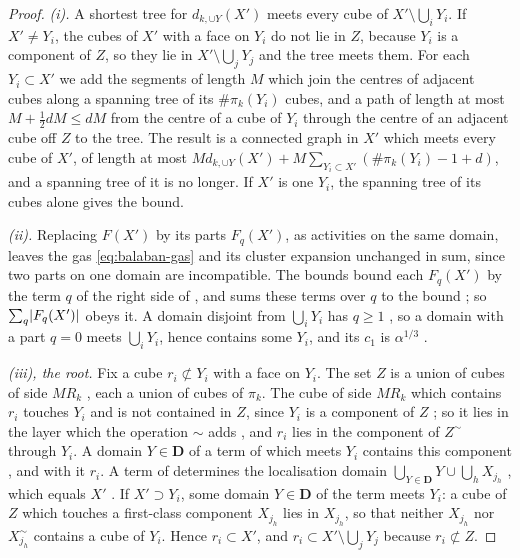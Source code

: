 \documentclass[11pt]{preprint}
\DeclarePairedDelimiter{\abs}{\lvert}{\rvert}
\numberwithin{equation}{section}
\theoremstyle{definition}
\theoremstyle{remark}
\theoremstyle{plain}
\begin{document}
\begin{proof}
\emph{(i).} A shortest tree for $d_{k,\cup Y}(X')$ meets every cube of $X' \setminus \bigcup_iY_i$. If $X' \neq Y_i$, the cubes of $X'$ with a face on $Y_i$ do not lie in $Z$, because $Y_i$ is a component of $Z$, so they lie in $X' \setminus \bigcup_jY_j$ and the tree meets them. For each $Y_i \subset X'$ we add the segments of length $M$ which join the centres of adjacent cubes along a spanning tree of its $\#\pi_k(Y_i)$ cubes, and a path of length at most $M + \frac12dM \leq dM$ from the centre of a cube of $Y_i$ through the centre of an adjacent cube off $Z$ to the tree. The result is a connected graph in $X'$ which meets every cube of $X'$, of length at most $Md_{k,\cup Y}(X') + M\sum_{Y_i \subset X'}(\#\pi_k(Y_i) - 1 + d)$, and a spanning tree of it is no longer. If $X'$ is one $Y_i$, the spanning tree of its cubes alone gives the bound.

\emph{(ii).} Replacing $F(X')$ by its parts $F_q(X')$, as activities on the same domain, leaves the gas \eqref{eq:balaban-gas} and its cluster expansion unchanged in sum, since two parts on one domain are incompatible. The bounds \cite[(1.92)--(1.95), pp.~388--389]{BalabanLFR2} bound each $F_q(X')$ by the term $q$ of the right side of \cite[(1.95)]{BalabanLFR2}, and \cite[(1.96)]{BalabanLFR2} sums these terms over $q$ to the bound \cite[(1.97)]{BalabanLFR2}; so $\sum_q\abs{F_q(X')}$ obeys it. A domain disjoint from $\bigcup_iY_i$ has $q \geq 1$ \cite[p.~389, ll.~27--28]{BalabanLFR2}, so a domain with a part $q = 0$ meets $\bigcup_iY_i$, hence contains some $Y_i$, and its $c_1$ is $\alpha^{1/3}$ \cite[p.~390, l.~2]{BalabanLFR2}.

\emph{(iii), the root.} Fix a cube $r_i \not\subset Y_i$ with a face on $Y_i$. The set $Z$ is a union of cubes of side $MR_k$ \cite[p.~380, ll.~47--49; p.~384, l.~24]{BalabanLFR2}, each a union of cubes of $\pi_k$. The cube of side $MR_k$ which contains $r_i$ touches $Y_i$ and is not contained in $Z$, since $Y_i$ is a component of $Z$ \cite[p.~378, ll.~20--21]{BalabanLFR2}; so it lies in the layer which the operation $\sim$ adds \cite[p.~245]{BalabanCRE}, and $r_i$ lies in the component of $Z^\sim$ through $Y_i$. A domain $Y \in \mathbf D$ of a term of \cite[(1.91)]{BalabanLFR2} which meets $Y_i$ contains this component \cite[p.~377, ll.~5--6]{BalabanLFR2}, and with it $r_i$. A term of \cite[(1.91)]{BalabanLFR2} determines the localisation domain $\bigcup_{Y \in \mathbf D}Y \cup \bigcup_hX_{j_h}$ \cite[p.~387, l.~42]{BalabanLFR2}, which equals $X'$ \cite[p.~388, l.~14]{BalabanLFR2}. If $X' \supset Y_i$, some domain $Y \in \mathbf D$ of the term meets $Y_i$: a cube of $Z$ which touches a first-class component $X_{j_h}$ lies in $X_{j_h}$, so that neither $X_{j_h}$ nor $X_{j_h}^\sim$ \cite[p.~389, ll.~9--10]{BalabanLFR2} contains a cube of $Y_i$. Hence $r_i \subset X'$, and $r_i \subset X' \setminus \bigcup_jY_j$ because $r_i \not\subset Z$.


\end{proof}
\end{document}
